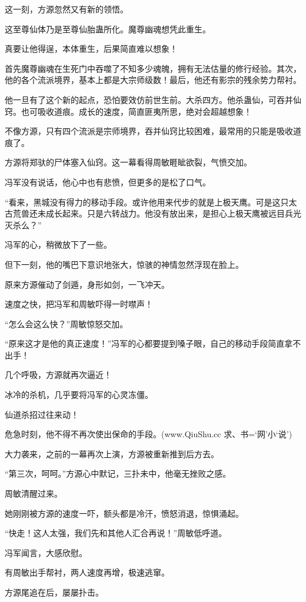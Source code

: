 \begin{this_body}
这一刻，方源忽然又有新的领悟。

这至尊仙体乃是至尊仙胎蛊所化。魔尊幽魂想凭此重生。

真要让他得逞，本体重生，后果简直难以想象！

首先魔尊幽魂在生死门中吞噬了不知多少魂魄，拥有无法估量的修行经验。其次，他的各个流派境界，基本上都是大宗师级数！最后，他还有影宗的残余势力帮衬。

他一旦有了这个新的起点，恐怕要效仿前世生前。大杀四方。他杀蛊仙，可吞并仙窍。也可吸收道痕。成长的速度，简直匪夷所思，绝对会超越想象！

不像方源，只有四个流派是宗师境界，吞并仙窍比较困难，最常用的只能是吸收道痕了。

方源将郑驮的尸体塞入仙窍。这一幕看得周敏睚眦欲裂，气愤交加。

冯军没有说话，他心中也有悲愤，但更多的是松了口气。

“看来，黑城没有得力的移动手段。或许他用来代步的就是上极天鹰。可是这只太古荒兽还未成长起来。只是六转战力。他没有放出来，是担心上极天鹰被远目兵光灭杀么？”

冯军的心，稍微放下了一些。

但下一刻，他的嘴巴下意识地张大，惊骇的神情忽然浮现在脸上。

原来方源催动了剑遁，身形如剑，一飞冲天。

速度之快，把冯军和周敏吓得一时噤声！

“怎么会这么快？”周敏惊怒交加。

“原来这才是他的真正速度！”冯军的心都要提到嗓子眼，自己的移动手段简直拿不出手！

几个呼吸，方源就再次逼近！

冰冷的杀机，几乎要将冯军的心灵冻僵。

仙道杀招过往来动！

危急时刻，他不得不再次使出保命的手段。(www.QiuShu.cc 求、书=‘网’小‘说’)

大力袭来，之前的一幕再次上演，方源被重新推到后方去。

“第三次，呵呵。”方源心中默记，三扑未中，他毫无挫败之感。

周敏清醒过来。

她刚刚被方源的速度一吓，额头都是冷汗，愤怒消退，惊惧涌起。

“快走！这人太强，我们先和其他人汇合再说！”周敏低呼道。

冯军闻言，大感欣慰。

有周敏出手帮衬，两人速度再增，极速逃窜。

方源尾追在后，屡屡扑击。


\end{this_body}
